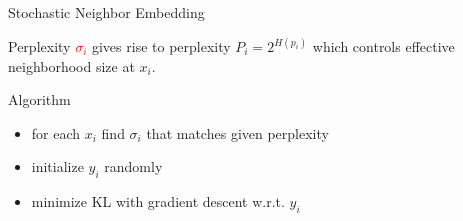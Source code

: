 \documentclass[unknownkeysallowed]{beamer}
\begin{document}
\begin{frame}{Stochastic Neighbor Embedding}

\begin{block}{Perplexity}
\textcolor{red}{$\sigma_i$} gives rise to perplexity $P_i = 2^{H(p_i)}$ which controls effective neighborhood size at $x_i$.
\end{block}

\begin{block}{Algorithm}
\begin{itemize}
	\item for each $x_i$ find $\sigma_i$ that matches given perplexity
    \item initialize $y_i$ randomly
    \item minimize KL with gradient descent w.r.t. $y_i$
\end{itemize}
\end{block}

\end{frame}
\end{document}
